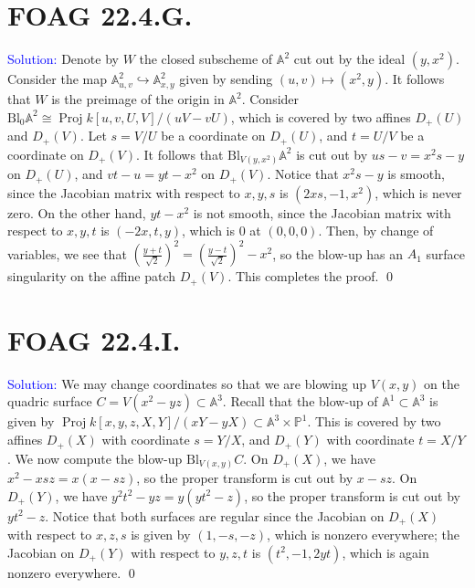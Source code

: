 \documentclass[11pt]{article}
\renewcommand{\AA}{\mathbb{A}}
\newcommand{\PP}{\mathbb{P}}
\newcommand{\Proj}{\operatorname{Proj}}
\newcommand{\Bl}{\mathrm{Bl}}
\newenvironment{solution}{\begin{trivlist}\item[]{\textcolor{blue}{Solution:}}}{\qed \end{trivlist}}
\begin{document}
\newpage

\section*{FOAG 22.4.G.}

\begin{solution}
    Denote by $W$ the closed subscheme of $\AA^2$ cut out by the ideal $(y, x^2)$. Consider the map $\AA^2_{u,v} \hookrightarrow \AA^2_{x,y}$ given by sending $(u,v) \mapsto (x^2,y)$. It follows that $W$ is the preimage of the origin in $\AA^2$. Consider $\Bl_0 \AA^2 \cong \Proj k[u,v,U,V] / (uV-vU)$, which is covered by two affines $D_+(U)$ and $D_+(V)$. Let $s = V / U$ be a coordinate on $D_+(U)$, and $t = U / V$ be a coordinate on $D_+(V)$. It follows that $\Bl_{V(y,x^2)} \AA^2$ is cut out by $us - v = x^2s - y$ on $D_+(U)$, and $vt - u = yt - x^2$ on $D_+(V)$. Notice that $x^2s - y$ is smooth, since the Jacobian matrix with respect to $x,y,s$ is $(2xs, -1, x^2)$, which is never zero. On the other hand, $yt - x^2$ is not smooth, since the Jacobian matrix with respect to $x,y,t$ is $(-2x, t, y)$, which is $0$ at $(0,0,0)$. Then, by change of variables, we see that $(\frac{y+t}{\sqrt2})^2 = (\frac{y-t}{\sqrt2})^2 - x^2$, so the blow-up has an $A_1$ surface singularity on the affine patch $D_+(V)$. This completes the proof. 
\end{solution}

\newpage

\section*{FOAG 22.4.I.}

\begin{solution}
    We may change coordinates so that we are blowing up $V(x,y)$ on the quadric surface $C = V(x^2 - yz) \subset \AA^3$. Recall that the blow-up of $\AA^1 \subset \AA^3$ is given by $\Proj k[x,y,z,X,Y]/(xY - yX) \subset \AA^3 \times \PP^1$. This is covered by two affines $D_+(X)$ with coordinate $s = Y/X$, and $D_+(Y)$ with coordinate $t = X/Y$. We now compute the blow-up $\Bl_{V(x,y)}C$. On $D_+(X)$, we have $x^2 - xsz = x(x - sz)$, so the proper transform is cut out by $x - sz$. On $D_+(Y)$, we have $y^2t^2 - yz = y(yt^2 - z)$, so the proper transform is cut out by $yt^2 - z$. Notice that both surfaces are regular since the Jacobian on $D_+(X)$ with respect to $x,z,s$ is given by $(1, -s, -z)$, which is nonzero everywhere; the Jacobian on $D_+(Y)$ with respect to $y,z,t$ is $(t^2, -1, 2yt)$, which is again nonzero everywhere. 
\end{solution}
\end{document}
